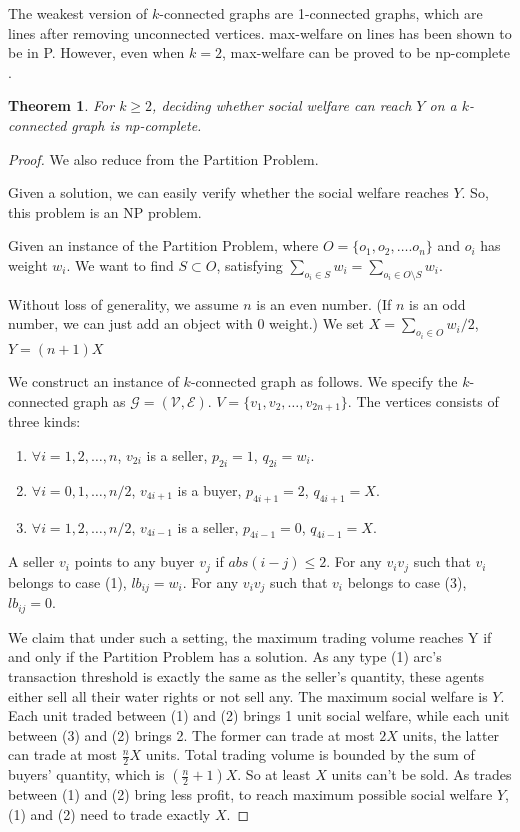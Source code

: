 \documentclass{aamas2015}
\newtheorem{theorem}{Theorem}%
\begin{document}
The weakest version of $k$-connected graphs are 1-connected graphs, which are lines after removing unconnected vertices. {\sc max-welfare} on lines has been shown to be in {\sc P}. However, even when $k=2$, {\sc max-welfare} can be proved to be {\sc np-complete} .


\begin{theorem}
	For $k\geq 2$, deciding whether social welfare can reach $Y$ on a $k$-connected graph is {\sc np-complete}.
\end{theorem}
\begin{proof}
	We also reduce from the {\sc Partition Problem}.
	
	Given a solution, we can easily verify whether the social welfare reaches $Y$. So, this problem is an NP problem.
	
	Given an instance of the {\sc Partition Problem}, where $O=\{o_1,o_2,\ldots. o_n\}$ and $o_i$ has weight $w_i$.
	We want to find $S\subset O$, satisfying $\sum_{o_i\in S}w_i=\sum_{o_i\in O\setminus S}w_i$.
	
	Without loss of generality, we assume $n$ is an even number.
	(If $n$ is an odd number, we can just add an object with $0$ weight.)
	We set $X=\sum_{o_i\in O}w_i/2$, $Y=(n+1)X$
	
	We construct an instance of $k$-connected graph as follows.
	We specify the $k$-connected graph as $\mathcal{G}=(\mathcal{V},\mathcal{E})$.
	$V=\{v_1,v_2,\ldots,v_{2n+1}\}$.
	The vertices consists of three kinds:
	\begin{enumerate}
		\item $\forall i=1,2,\ldots, n$, $v_{2i}$ is a seller, $p_{2i}=1$, $q_{2i}=w_i$.
		\item $\forall i=0,1,\ldots, n/2$, $v_{4i+1}$ is a buyer, $p_{4i+1}=2$, $q_{4i+1}=X$.
		\item $\forall i=1,2,\ldots, n/2$, $v_{4i-1}$ is a seller, $p_{4i-1}=0$, $q_{4i-1}=X$.
	\end{enumerate}
	
	A seller $v_i$ points to any buyer $v_j$ if $abs(i-j)\leq 2$.
	For any $v_iv_j$ such that $v_i$ belongs to case (1), $lb_{ij}=w_i$.
	For any $v_iv_j$ such that $v_i$ belongs to case (3), $lb_{ij}=0$.
	
	We claim that under such a setting, the maximum trading volume reaches Y if and only if the {\sc Partition Problem} has a solution.
	As any type (1) arc's transaction threshold is exactly the same as the seller's quantity, these agents either sell all their water rights or not sell any.
	The maximum social welfare is $Y$.
	Each unit traded between (1) and (2) brings 1 unit social welfare, while each unit between (3) and (2) brings 2.
	The former can trade at most $2X$ units, the latter can trade at most $\frac{n}{2}X$ units.
	Total trading volume is bounded by the sum of buyers' quantity, which is $(\frac{n}{2}+1)X$.
	So at least $X$ units can't be sold.
	As trades between (1) and (2) bring less profit, to reach maximum possible social welfare $Y$, (1) and (2) need to trade exactly $X$.
	

\end{proof}
\end{document}
